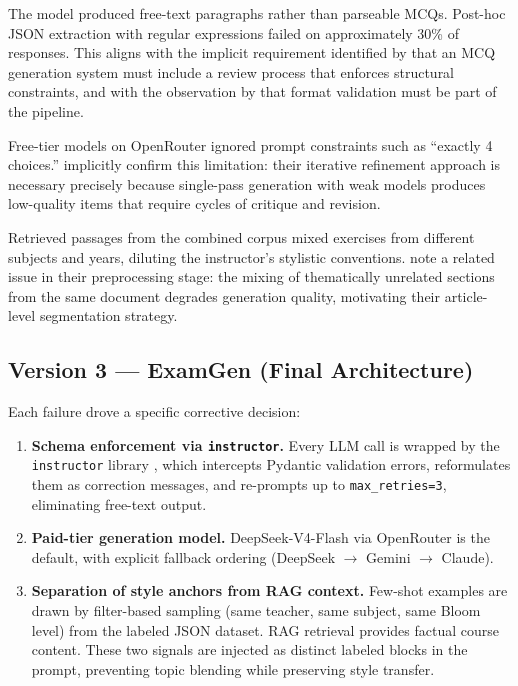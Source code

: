 \documentclass[12pt, a4paper]{article}
\begin{document}
\begin{description}[leftmargin=1em]
  \item[Failure 1 --- No structured output enforcement.]
  The model produced free-text paragraphs rather than parseable MCQs.
  Post-hoc JSON extraction with regular expressions failed on approximately 30\%
  of responses. This aligns with the implicit requirement identified by
  \citet{mucciaccia2025mcq} that an MCQ generation system must include a review
  process that enforces structural constraints, and with the observation by
  \citet{morris2024aqg} that format validation must be part of the pipeline.

  \item[Failure 2 --- Free-tier instruction-following fidelity.]
  Free-tier models on OpenRouter ignored prompt constraints such as
  ``exactly 4 choices.'' \citet{isley2025quality} implicitly confirm this
  limitation: their iterative refinement approach is necessary precisely because
  single-pass generation with weak models produces low-quality items that
  require cycles of critique and revision.

  \item[Failure 3 --- Semantic retrieval blends topics.]
  Retrieved passages from the combined corpus mixed exercises from different
  subjects and years, diluting the instructor's stylistic conventions.
  \citet{mucciaccia2025mcq} note a related issue in their preprocessing stage:
  the mixing of thematically unrelated sections from the same document degrades
  generation quality, motivating their article-level segmentation strategy.
\end{description}

\subsection{Version 3 --- ExamGen (Final Architecture)}

Each failure drove a specific corrective decision:

\begin{enumerate}[leftmargin=2em]
  \item \textbf{Schema enforcement via \texttt{instructor}.}
  Every LLM call is wrapped by the \texttt{instructor} library \cite{instructor2023},
  which intercepts Pydantic validation errors, reformulates them as correction
  messages, and re-prompts up to \texttt{max\_retries=3}, eliminating free-text
  output.

  \item \textbf{Paid-tier generation model.}
  DeepSeek-V4-Flash \cite{deepseek2024} via OpenRouter is the default, with
  explicit fallback ordering (DeepSeek $\to$ Gemini $\to$ Claude).

  \item \textbf{Separation of style anchors from RAG context.}
  Few-shot examples are drawn by filter-based sampling (same teacher, same
  subject, same Bloom level) from the labeled JSON dataset. RAG retrieval
  provides factual course content. These two signals are injected as distinct
  labeled blocks in the prompt, preventing topic blending while preserving
  style transfer.
\end{enumerate}
\end{document}
